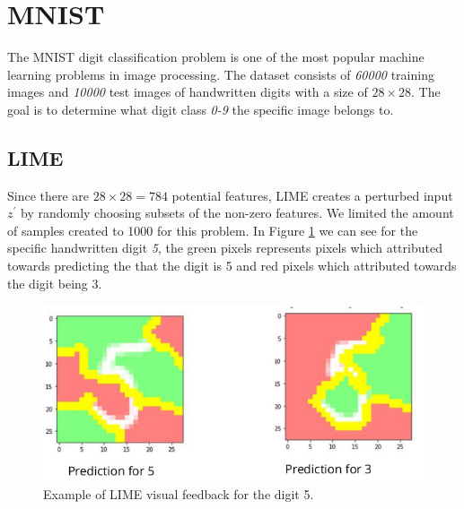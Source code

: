 \section{MNIST}

The MNIST digit classification problem is one of the most popular machine learning problems in image processing. The dataset consists of \emph{60000} training images and \emph{10000} test images of handwritten digits with a size of $28\times28$. The goal is to determine what digit class \emph{0-9} the specific image belongs to.

\subsection{LIME}
Since there are $28 \times 28 = 784$ potential features, LIME creates a perturbed input $z^{'}$ by randomly choosing subsets of the non-zero features.  We limited the amount of samples created to 1000 for this problem. In Figure \ref{fig:lime-mnist} we can see for the specific handwritten digit \emph{5}, the green pixels represents pixels which attributed towards predicting the that the digit is 5 and red pixels which attributed towards the digit being 3.
\begin  {figure}[!htpb]
  \includegraphics[width=\linewidth]{Evaluation_Images/Lime_mnist.jpg}
  \caption{Example of LIME visual feedback for the digit 5.}
  \label{fig:lime-mnist}
\end{figure}

